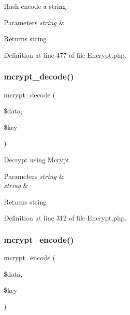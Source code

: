 Hash encode a string


\begin{DoxyParams}{Parameters}
{\em string} & \\
\hline
\end{DoxyParams}
\begin{DoxyReturn}{Returns}
string 
\end{DoxyReturn}


Definition at line 477 of file Encrypt.\+php.

\mbox{\label{class_c_i___encrypt_a85f02c928abbbc5a6bf038ea5292324d}} 
\subsubsection{\texorpdfstring{mcrypt\_decode()}{mcrypt\_decode()}}
{\footnotesize\ttfamily mcrypt\+\_\+decode (\begin{DoxyParamCaption}\item[{}]{\$data,  }\item[{}]{\$key }\end{DoxyParamCaption})}

Decrypt using Mcrypt


\begin{DoxyParams}{Parameters}
{\em string} & \\
\hline
{\em string} & \\
\hline
\end{DoxyParams}
\begin{DoxyReturn}{Returns}
string 
\end{DoxyReturn}


Definition at line 312 of file Encrypt.\+php.

\mbox{\label{class_c_i___encrypt_aa1d7e40f65deb526fe4619da65c6b1ec}} 
\subsubsection{\texorpdfstring{mcrypt\_encode()}{mcrypt\_encode()}}
{\footnotesize\ttfamily mcrypt\+\_\+encode (\begin{DoxyParamCaption}\item[{}]{\$data,  }\item[{}]{\$key }\end{DoxyParamCaption})}

